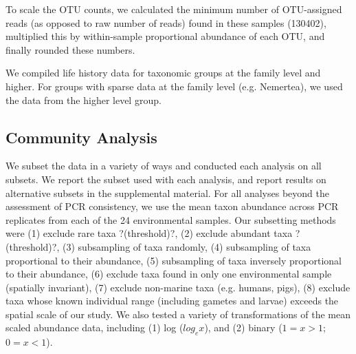 \documentclass[11pt,letterpaper]{article} %
\begin{document}
%
%
%
%
%
%
%


To scale the OTU counts, we calculated the minimum number of OTU-assigned reads (as opposed to raw number of reads) found in these samples (130402), multiplied this by within-sample proportional abundance of each OTU, and finally rounded these numbers.

We compiled life history data for taxonomic groups at the family level and higher.
For groups with sparse data at the family level (e.g. Nemertea), we used the data from the higher level group.


\subsection*{Community Analysis}

We subset the data in a variety of ways and conducted each analysis on all subsets.
We report the subset used with each analysis, and report results on alternative subsets in the supplemental material. 
For all analyses beyond the assessment of PCR consistency, we use the mean taxon abundance across PCR replicates from each of the 24 environmental samples.
Our subsetting methods were (1) exclude rare taxa ?(threshold)?, (2) exclude abundant taxa ?(threshold)?, (3) subsampling of taxa randomly, (4) subsampling of taxa proportional to their abundance, (5) subsampling of taxa inversely proportional to their abundance, (6) exclude taxa found in only one environmental sample (spatially invariant), (7) exclude non-marine taxa (e.g. humans, pigs), (8) exclude taxa whose known individual range (including gametes and larvae) exceeds the spatial scale of our study. 
We also tested a variety of transformations of the mean scaled abundance data, including (1) log ($log_{e}x$), and (2) binary ($1 = x > 1$; $0 = x < 1$).
\end{document}
